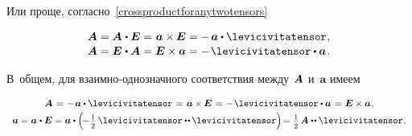 \begin{otherlanguage}{russian}
Или проще, согласно~\eqref{crossproductforanytwotensors}

\nopagebreak\vspace{-0.1em}\begin{equation*}\begin{array}{c}
\bm{A} = \bm{A} \hspace{.1ex} \dotp \UnitDyad = \hspace{.1ex} \bm{a} \times \hspace{-0.1ex} \UnitDyad = - \hspace{.3ex} \bm{a} \dotp \levicivitatensor
\hspace{.1ex} ,
\\[.1em]
\bm{A} = \UnitDyad \hspace{.1ex} \dotp \bm{A} = \UnitDyad \times \bm{a} = - \hspace{.2ex} \levicivitatensor \dotp \bm{a}
\hspace{.2ex} .
\end{array}\end{equation*}

В~общем, для взаимно\hbox{-}однозначного соответствия между~${\hspace{-0.2ex}\bm{A}}$ и~$\bm{a}$ имеем

\nopagebreak\vspace{-0.25em}\begin{equation}\label{companionvector}
\begin{array}{c}
\bm{A} \hspace{.2ex} = \hspace{.1ex} - \hspace{.3ex} \bm{a} \dotp \levicivitatensor \hspace{.2ex} = \hspace{.2ex} \bm{a} \times\hspace{-0.1ex} \UnitDyad \hspace{.2ex} = \hspace{.1ex} - \hspace{.2ex} \levicivitatensor \dotp \bm{a} \hspace{.2ex} = \hspace{.1ex} \UnitDyad \times \bm{a}
\hspace{.1ex} ,
\\[.3em]
%
\bm{a} = \bm{a} \hspace{.1ex} \dotp \UnitDyad = \bm{a} \dotp \left( \hspace{-0.3ex} - \displaystyle \hspace{.2ex} \smalldisplaystyleonehalf \hspace{.4ex} \levicivitatensor \dotdotp \hspace{-0.1ex} \levicivitatensor \right) \hspace{-0.4ex} = \hspace{.1ex} \smalldisplaystyleonehalf \hspace{.32ex} \bm{A} \dotdotp \levicivitatensor
\hspace{.1ex} .
\end{array}
\end{equation}


\end{otherlanguage}
